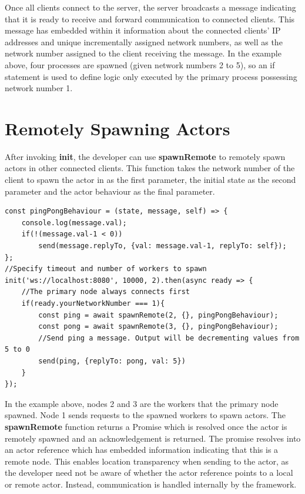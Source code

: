 \documentclass[12pt, a4paper]{report}
\theoremstyle{definition}
\theoremstyle{definition}%
\theoremstyle{definition}%
\theoremstyle{definition}%
\theoremstyle{definition}%
\theoremstyle{definition}%
\begin{document}
Once all clients connect to the server, the server broadcasts a message indicating that it is ready to receive and forward communication to connected clients. This message has embedded within it information about the connected clients' IP addresses and unique incrementally assigned network numbers, as well as the network number assigned to the client receiving the message. In the example above, four processes are spawned (given network numbers 2 to 5), so an if statement is used to define logic only executed by the primary process possessing network number 1.

\section{Remotely Spawning Actors}
After invoking \textbf{init}, the developer can use \textbf{spawnRemote} to remotely spawn actors in other connected clients. This function takes the network number of the client to spawn the actor in as the first parameter, the initial state as the second parameter and the actor behaviour as the final parameter.
\begin{lstlisting}
const pingPongBehaviour = (state, message, self) => {
    console.log(message.val);
    if(!(message.val-1 < 0))
        send(message.replyTo, {val: message.val-1, replyTo: self});
};
//Specify timeout and number of workers to spawn
init('ws://localhost:8080', 10000, 2).then(async ready => {
    //The primary node always connects first
    if(ready.yourNetworkNumber === 1){
        const ping = await spawnRemote(2, {}, pingPongBehaviour);
        const pong = await spawnRemote(3, {}, pingPongBehaviour);
        //Send ping a message. Output will be decrementing values from 5 to 0
        send(ping, {replyTo: pong, val: 5})
    }
});
\end{lstlisting}
In the example above, nodes 2 and 3 are the workers that the primary node spawned. Node 1 sends requests to the spawned workers to spawn actors. The \textbf{spawnRemote} function returns a Promise which is resolved once the actor is remotely spawned and an acknowledgement is returned. The promise resolves into an actor reference which has embedded information indicating that this is a remote node. This enables location transparency when sending to the actor, as the developer need not be aware of whether the actor reference points to a local or remote actor. Instead, communication is handled internally by the framework.


\bibliomatter
\raggedright


 
\end{document}
